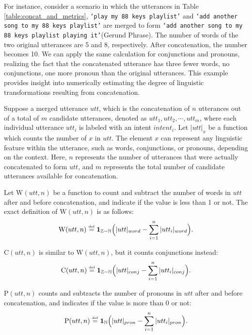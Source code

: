 For instance, consider a scenario in which the utterances in Table \ref{table:concat_and_metrics}, \texttt{`play my 88 keys playlist'} and \texttt{`add another song to my 88 keys playlist'} are merged to form \texttt{`add another song to my 88 keys playlist playing it'}(Gerund Phrase). 
The number of words of the two original utterances are 5 and 8, respectively.
After concatenation, the number becomes 10.
We can apply the same calculation for conjunctions and pronouns, realizing the fact that the concatenated utterance has three fewer words, no conjunctions, one more pronoun than the original utterances.
This example provides insight into numerically estimating the degree of linguistic transformations resulting from concatenation.

Suppose a merged utterance $utt$, which is the concatenation of $n$ utterances out of a total of $m$ candidate utterances, denoted as $utt_1, utt_2, \cdots, utt_m$, where each individual utterance $utt_i$ is labeled with an intent $intent_i$. 
Let $|utt|_{x}$ be a function which counts the number of $x$ in $utt$. 
The element $x$ can represent any linguistic feature within the utterance, such as words, conjunctions, or pronouns, depending on the context.
Here, $n$ represents the number of utterances that were actually concatenated to form $utt$, and $m$ represents the total number of candidate utterances available for concatenation.

Let $\mathrm{W}(utt, n)$ be a function to count and subtract the number of words in $utt$ after and before concatenation, and indicate if the value is less than 1 or not.
The exact definition of $\mathrm{W}(utt, n)$ is as follows: 
\begin{equation}
\mathrm{W}(utt, n)\\
\overset{\underset{\mathrm{def}}{}}{=}\mathbf{1}_{\mathbb{Z}-\mathbb{N}}\Bigl(|utt|_{word}-\sum_{i=1}^n |utt_i|_{word}\Bigr).    
\end{equation}

$\mathrm{C}(utt, n)$ is similar to $\mathrm{W}(utt, n)$, but it counts conjunctions instead:
\begin{equation}
\mathrm{C}(utt, n)\\
\overset{\underset{\mathrm{def}}{}}{=}\mathbf{1}_{\mathbb{Z}-\mathbb{N}}\Bigl(|utt|_{conj}-\sum_{i=1}^n |utt_i|_{conj}\Bigr).
\end{equation}

$\mathrm{P}(utt, n)$ counts and subtracts the number of pronouns in $utt$ after and before concatenation, and indicates if the value is more than 0 or not:
\begin{equation}
\mathrm{P}(utt, n)\\
\overset{\underset{\mathrm{def}}{}}{=}\mathbf{1}_{\mathbb{N}}\Bigl(|utt|_{pron}-\sum_{i=1}^n |utt_i|_{pron}\Bigr).
\end{equation}

